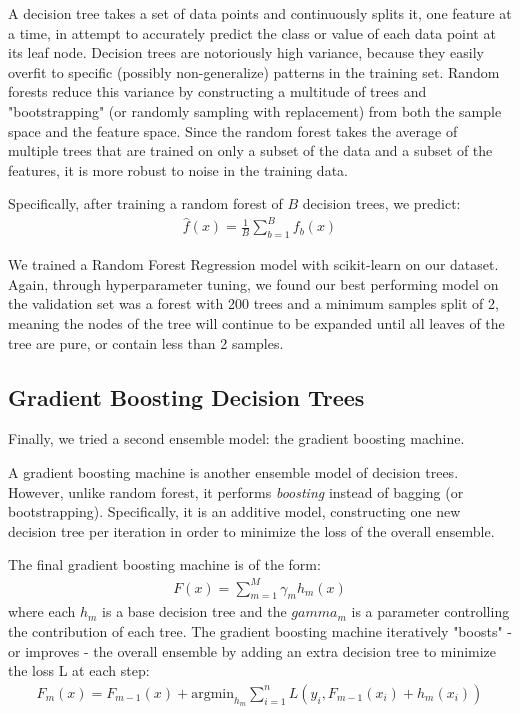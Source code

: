 \documentclass[journal]{IEEEtran}
\begin{document}
A decision tree takes a set of data points and continuously splits it, one feature at a time, in attempt to accurately predict the class or value of each data point at its leaf node. Decision trees are notoriously high variance, because they easily overfit to specific (possibly non-generalize) patterns in the training set. Random forests reduce this variance by constructing a multitude of trees and "bootstrapping" (or randomly sampling with replacement) from both the sample space and the feature space. Since the random forest takes the average of multiple trees that are trained on only a subset of the data and a subset of the features, it is more robust to noise in the training data.

Specifically, after training a random forest of $B$ decision trees, we predict: \begin{align*}
    \hat{f}(x) = \frac{1}{B}\sum_{b=1}^{B} f_b(x)
\end{align*}

We trained a Random Forest Regression model with scikit-learn on our dataset. Again, through hyperparameter tuning, we found our best performing model on the validation set was a forest with 200 trees and a minimum samples split of 2, meaning the nodes of the tree will continue to be expanded until all leaves of the tree are pure, or contain less than 2 samples. 

\subsection{Gradient Boosting Decision Trees}
Finally, we tried a second ensemble model: the gradient boosting machine.

A gradient boosting machine is another ensemble model of decision trees. However, unlike random forest, it performs \textit{boosting} instead of bagging (or bootstrapping). Specifically, it is an additive model, constructing one new decision tree per iteration in order to minimize the loss of the overall ensemble.

The final gradient boosting machine is of the form: \begin{align*}
    F(x) = \sum_{m=1}^{M}\gamma_m h_m(x)
\end{align*}
where each $h_m$ is a base decision tree and the $gamma_m$ is a parameter controlling the contribution of each tree. The gradient boosting machine iteratively "boosts" - or improves - the overall ensemble by adding an extra decision tree to minimize the loss L at each step: \begin{align*}
    F_m(x) = F_{m-1}(x) + \text{argmin}_{h_m} \sum_{i=1}^{n} L(y_i, F_{m-1}(x_i)+h_m(x_i))
\end{align*}
\end{document}

